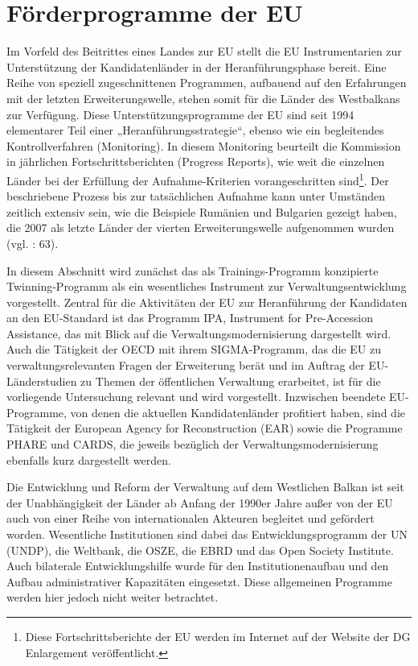 \section{Förderprogramme der EU}
Im Vorfeld des Beitrittes eines Landes zur EU stellt die EU Instrumentarien zur Unterstützung der Kandidatenländer in der Heranführungsphase bereit. Eine Reihe von speziell zugeschnittenen Programmen, aufbauend auf den Erfahrungen mit der letzten Erweiterungswelle, stehen somit für die Länder des Westbalkans zur Verfügung. Diese Unterstützungsprogramme der EU sind seit 1994 elementarer Teil einer „Heranführungsstrategie“, ebenso wie ein begleitendes Kontrollverfahren (Monitoring). In diesem Monitoring beurteilt die Kommission in jährlichen Fortschrittsberichten (Progress Reports), wie weit die einzelnen Länder bei der Erfüllung der Aufnahme-Kriterien vorangeschritten sind\footnote{Diese Fortschrittsberichte der EU werden im Internet auf der Website der DG Enlargement veröffentlicht.}. Der beschriebene Prozess bis zur tatsächlichen Aufnahme kann unter Umständen zeitlich extensiv sein, wie die Beispiele Rumänien und Bulgarien gezeigt haben, die 2007 als letzte Länder der vierten Erweiterungswelle aufgenommen wurden (vgl. \cite{scherman}: 63). 
\par
In diesem Abschnitt wird zunächst das als Trainings-Programm konzipierte Twinning-Programm als ein wesentliches Instrument zur Verwaltungsentwicklung vorgestellt. Zentral für die Aktivitäten der EU zur Heranführung der Kandidaten an den EU-Standard ist das Programm IPA, Instrument for Pre-Accession Assistance, das mit Blick auf die Verwaltungsmodernisierung dargestellt wird. Auch die Tätigkeit der OECD mit ihrem SIGMA-Programm, das die EU zu verwaltungsrelevanten Fragen der Erweiterung berät und im Auftrag der EU-Länderstudien zu Themen der öffentlichen Verwaltung erarbeitet, ist für die vorliegende Untersuchung relevant und wird vorgestellt. Inzwischen beendete EU-Programme, von denen die aktuellen Kandidatenländer profitiert haben, sind die Tätigkeit der European Agency for Reconstruction (EAR) sowie die Programme PHARE und CARDS, die jeweils bezüglich der Verwaltungsmodernisierung ebenfalls kurz dargestellt werden. \par
Die Entwicklung und Reform der Verwaltung auf dem Westlichen Balkan ist seit der Unabhängigkeit der Länder ab Anfang der 1990er Jahre außer von der EU auch von einer Reihe von internationalen Akteuren begleitet und gefördert worden. Wesentliche Institutionen sind dabei das Entwicklungsprogramm der UN (UNDP), die Weltbank, die OSZE, die EBRD und das Open Society Institute. Auch bilaterale Entwicklungshilfe wurde für den Institutionenaufbau und den Aufbau administrativer Kapazitäten eingesetzt. Diese allgemeinen Programme werden hier jedoch nicht weiter betrachtet.
